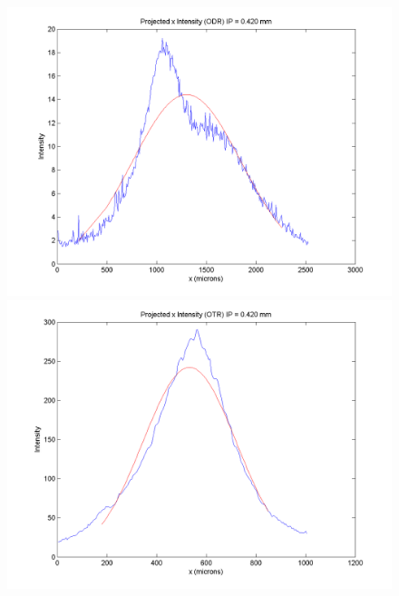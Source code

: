 \documentclass[12pt]{article}
\begin{document}
\begin{figure}
\begin{center}
\includegraphics[scale=0.5]{Figures/ProjX_ODR_420.PNG}
\includegraphics[scale=0.5]{Figures/ProjX_OTR_420.PNG}
\caption{}
\end{center}
\end{figure}
\end{document}
